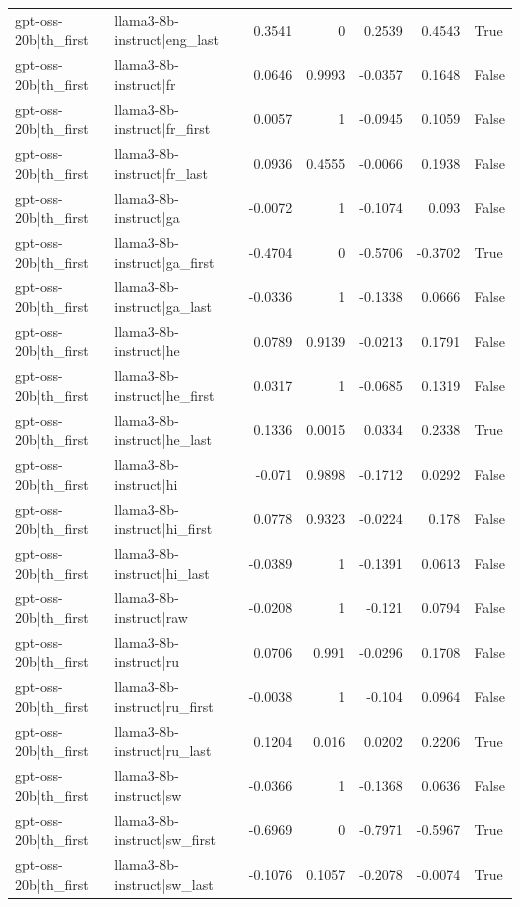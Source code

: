 \begin{table}
\begin{tabular}{l l r r r r l}
gpt-oss-20b|th_first & llama3-8b-instruct|eng_last & 0.3541 & 0 & 0.2539 & 0.4543 & True \\
gpt-oss-20b|th_first & llama3-8b-instruct|fr & 0.0646 & 0.9993 & -0.0357 & 0.1648 & False \\
gpt-oss-20b|th_first & llama3-8b-instruct|fr_first & 0.0057 & 1 & -0.0945 & 0.1059 & False \\
gpt-oss-20b|th_first & llama3-8b-instruct|fr_last & 0.0936 & 0.4555 & -0.0066 & 0.1938 & False \\
gpt-oss-20b|th_first & llama3-8b-instruct|ga & -0.0072 & 1 & -0.1074 & 0.093 & False \\
gpt-oss-20b|th_first & llama3-8b-instruct|ga_first & -0.4704 & 0 & -0.5706 & -0.3702 & True \\
gpt-oss-20b|th_first & llama3-8b-instruct|ga_last & -0.0336 & 1 & -0.1338 & 0.0666 & False \\
gpt-oss-20b|th_first & llama3-8b-instruct|he & 0.0789 & 0.9139 & -0.0213 & 0.1791 & False \\
gpt-oss-20b|th_first & llama3-8b-instruct|he_first & 0.0317 & 1 & -0.0685 & 0.1319 & False \\
gpt-oss-20b|th_first & llama3-8b-instruct|he_last & 0.1336 & 0.0015 & 0.0334 & 0.2338 & True \\
gpt-oss-20b|th_first & llama3-8b-instruct|hi & -0.071 & 0.9898 & -0.1712 & 0.0292 & False \\
gpt-oss-20b|th_first & llama3-8b-instruct|hi_first & 0.0778 & 0.9323 & -0.0224 & 0.178 & False \\
gpt-oss-20b|th_first & llama3-8b-instruct|hi_last & -0.0389 & 1 & -0.1391 & 0.0613 & False \\
gpt-oss-20b|th_first & llama3-8b-instruct|raw & -0.0208 & 1 & -0.121 & 0.0794 & False \\
gpt-oss-20b|th_first & llama3-8b-instruct|ru & 0.0706 & 0.991 & -0.0296 & 0.1708 & False \\
gpt-oss-20b|th_first & llama3-8b-instruct|ru_first & -0.0038 & 1 & -0.104 & 0.0964 & False \\
gpt-oss-20b|th_first & llama3-8b-instruct|ru_last & 0.1204 & 0.016 & 0.0202 & 0.2206 & True \\
gpt-oss-20b|th_first & llama3-8b-instruct|sw & -0.0366 & 1 & -0.1368 & 0.0636 & False \\
gpt-oss-20b|th_first & llama3-8b-instruct|sw_first & -0.6969 & 0 & -0.7971 & -0.5967 & True \\
gpt-oss-20b|th_first & llama3-8b-instruct|sw_last & -0.1076 & 0.1057 & -0.2078 & -0.0074 & True \\

\end{tabular}
\end{table}
